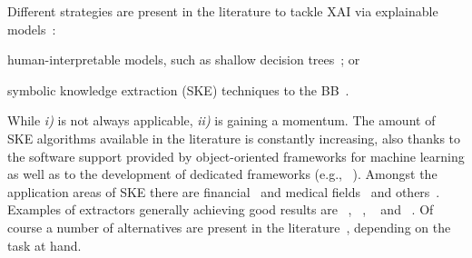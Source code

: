 \documentclass[sigconf]{acmart}
\begin{document}
Different strategies are present in the literature to tackle XAI via explainable models~\cite{guidotti2018survey}:
%
\begin{inlinelist}
	\item human-interpretable models, such as shallow decision trees~\cite{Rudin2019}; or
	\item symbolic knowledge extraction (SKE) techniques to the BB~\cite{KENNY2021103459}.
\end{inlinelist}
%
While \textit{i)} is not always applicable, \textit{ii)} is gaining a momentum. The amount of SKE algorithms available in the literature is constantly increasing, also thanks to the software support provided by object-oriented frameworks for machine learning as well as to the development of dedicated frameworks (e.g., \psyke{}~\cite{psyke-woa2021,psyke-ia2022,psyke-extraamas2022}).
%
%
Amongst the application areas of SKE there are financial~\cite{baesens2001building,baesens2003using,steiner2006using} and medical fields~\cite{bologna1997three,franco2007early,hayashi2000comparison} and others~\cite{setiono2011rule,sabbatini22LPFSKE,azcarraga2012keyword,hofmann2003rule}.
%
Examples of extractors generally achieving good results are \cart{}~\cite{breiman1984classification}, \trepan{}~\cite{craven1996extracting}, \gridex{}~\cite{gridex-extraamas2021} and \gridrex{}~\cite{gridrex-kr2022}.
%
Of course a number of alternatives are present in the literature~\cite{craven1994using,huysmans2006iter,barakat2005eclectic,martens2007comprehensible}, depending on the task at hand.
\end{document}
